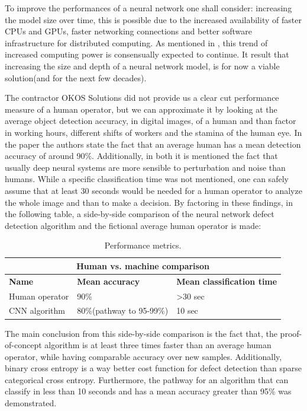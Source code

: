 \documentclass[12pt,a4paper,twoside]{report}
\begin{document}
To improve the performances of a neural network one shall consider: increasing the model size over time, this is possible due to the increased availability of faster CPUs and GPUs, faster networking connections and better software infrastructure for distributed computing. As mentioned in \cite{book-deeplearning}, this trend of increased computing power is consensually expected to continue. It result that increasing the size and depth of a neural network model, is for now a viable solution(and for the next few decades).\par

The contractor OKOS Solutions did not provide us a clear cut performance measure of a human operator, but we can approximate it by looking at the average object detection accuracy, in digital images, of a human and than factor in working hours, different shifts of workers and the stamina of the human eye. In the paper \cite{article-studyhumandeep, article-studyhumandeep2} the authors state the fact that an average human has a mean detection accuracy of around 90\%. Additionally, in both it is mentioned the fact that usually deep neural systems are more sensible to perturbation and noise than humans. While a specific classification time was not mentioned, one can safely assume that at least 30 seconds would be needed for a human operator to analyze the whole image and than to make a decision. By factoring in these findings, in the following table, a side-by-side comparison of the neural network defect detection algorithm and the fictional average human operator is made:
\begin{table}[h!]
\centering
\begin{tabular}{ |p{3cm}||p{3cm}|p{3cm}| }
 \hline
 \multicolumn{3}{|c|}{\textbf{Human vs. machine comparison}} \\
 \hline
 \textbf{Name} & \textbf{Mean accuracy} & \textbf{Mean classification time} \\
 \hline
 Human operator & 90\% & >30 sec\\
 \hline
 CNN algorithm & 80\%(pathway to 95-99\%) & 10 sec\\
 \hline
\end{tabular}
\caption{Performance metrics.}
\end{table}
\par
The main conclusion from this side-by-side comparison is the fact that, the proof-of-concept algorithm is at least three times faster than an average human operator, while having comparable accuracy over new samples. Additionally, binary cross entropy is a way better cost function for defect detection than sparse categorical cross entropy. Furthermore, the pathway for an algorithm that can classify in less than 10 seconds and has a mean accuracy greater than 95\% was demonstrated.\par
\end{document}
